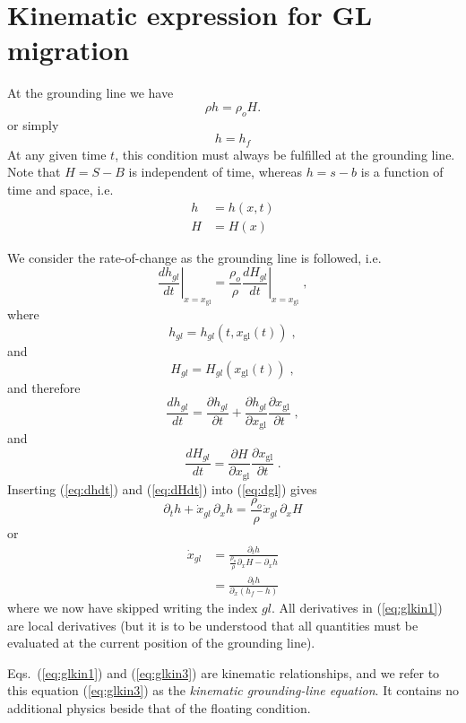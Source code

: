 \documentclass[10pt,a4paper]{book}
\newcommand{\p}{\partial}
\newcommand{\xgl}{x_{\mathrm{gl}}}
\begin{document}

\section{Kinematic expression for GL migration }

At the grounding line we have
\[
\rho h =\rho_o H.
\]
or simply
\[
 h=h_f
\]
At any given time $t$, this condition must always be fulfilled at the
grounding line.  Note that $H=S-B$ is independent of time, whereas
$h=s-b$ is a function of time and space, i.e.
\begin{align*}
 h&=h(x,t) \\
 H&=H(x)
\end{align*} 


We consider the rate-of-change as the grounding line
is followed, i.e.\
\begin{equation}
\left . \frac{d h_{gl}}{dt} \right |_{x=\xgl} = \frac{\rho_o}{\rho} \left . \frac{d H_{gl}}{dt}\right |_{x=\xgl}  \; ,
\label{eq:dgl}
\end{equation}
where
\[
h_{gl}=h_{gl}(t,\xgl(t))\;,
\] 
and
\[
H_{gl}=H_{gl}(\xgl(t))\;,
\] 
and therefore
\begin{equation}
\frac{d h_{gl}}{dt}=\frac{\p h_{gl}}{\p t} + \frac{\p h_{gl}}{\p \xgl} \frac{\p \xgl}{\p t}\;,
\label{eq:dhdt}
\end{equation}
and
\begin{equation}
\frac{d H_{gl}}{dt}=\frac{\p H}{\p \xgl} \frac{\p \xgl}{\p t}\;.
\label{eq:dHdt}
\end{equation}
Inserting (\ref{eq:dhdt}) and (\ref{eq:dHdt}) into (\ref{eq:dgl}) gives
\[
\p_t h + \dot{x}_{gl} \, \p_x h = \frac{\rho_o}{\rho} \dot{x}_{gl} \, \p_x H 
\]
or
\begin{align}
\dot{x}_{gl} & = \frac{\p_t h}{\frac{\rho_o}{\rho}\p_x H - \p_x h}  \label{eq:glkin1}\\
            & = \frac{\p_t h }{\p_x (h_f -  h)}                 \label{eq:glkin3}
\end{align}
where we now have skipped writing the index $gl$. All derivatives in
(\ref{eq:glkin1}) are local derivatives (but it is to be understood
that all quantities must be evaluated at the current position of the
grounding line). 


Eqs.~(\ref{eq:glkin1}) and (\ref{eq:glkin3}) are kinematic relationships,
and we refer to this equation (\ref{eq:glkin3}) as the {\em kinematic
  grounding-line equation}. It contains no additional physics beside
that of the floating condition.
\end{document}
